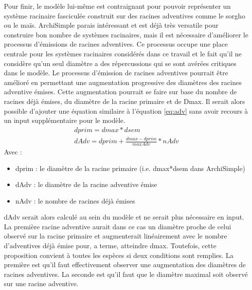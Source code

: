 Pour finir, le modèle lui-même est contraignant pour pouvoir représenter un système racinaire fasciculée construit sur des racines adventives comme le sorgho ou le maïs.
ArchiSimple parais intéressant et est déjà très versatile pour construire bon nombre de systèmes racinaires, mais il est nécessaire d'améliorer le processus d'émissions de racines adventives.
Ce processus occupe une place centrale pour les systèmes racinaires considérés dans ce travail et le fait qu'il ne considère qu'un seul diamètre a des répercussions qui se sont avérées critiques dans le modèle.
Le processus d'émission de racines adventives pourrait être amélioré en permettant une augmentation progressive des diamètres des racines adventive émises.
Cette augmentation pourrait se faire sur base du nombre de racines déjà émises, du diamètre de la racine primaire et de Dmax.
Il serait alors possible d'ajouter une équation similaire à l'équation \ref{eq:adv} sans avoir recours à un input supplémentaire pour le modèle.
\begin{equation}
    \begin{gathered}
        dprim = dmax*dsem \\
        dAdv = dprim + \frac{dmax - dprim}{maxAdv}*nAdv
    \end{gathered}
    \label{eq:adv}
\end{equation}
Avec :
\begin{itemize}
    \item dprim : le diamètre de la racine primaire (i.e. dmax*dsem dans ArchiSimple)
    \item dAdv : le diamètre de la racine adventive émise
    \item nAdv : le nombre de racines déjà émises
\end{itemize}
dAdv serait alors calculé au sein du modèle et ne serait plus nécessaire en input.
La première racine adventive aurait dans ce cas un diamètre proche de celui observé sur la racine primaire et augmenterait linéairement avec le nombre d'adventives déjà émise pour, a terme, atteindre dmax.
Toutefois, cette proposition convient à toutes les espèces si deux conditions sont remplies. 
La première est qu'il faut effectivement observer une augmentation des diamètres de racines adventives.
La seconde est qu'il faut que le diamètre maximal soit observé sur une racine adventive.
